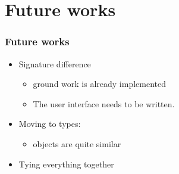 \documentclass[a4paper,11pt]{beamer}
\begin{document}
\section{Future works}

\begin{frame}\frametitle{Future works}
  \begin{itemize}
    \item Signature difference
      \begin{itemize}
        \item ground work is already implemented
        \item The user interface needs to be written.
      \end{itemize}
    \item Moving to types:
      \begin{itemize}
        \item objects are quite similar
      \end{itemize}
    \item Tying everything together
  \end{itemize}

\end{frame}
\end{document}
